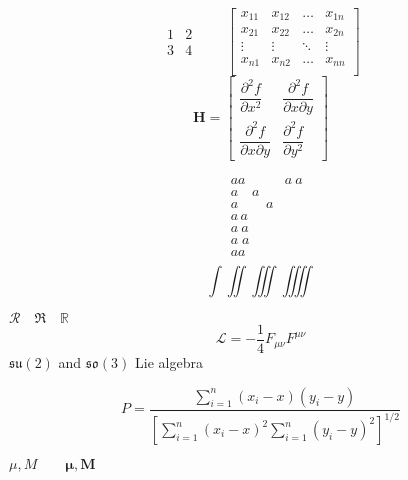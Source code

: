 \documentclass{article}
\begin{document}
	\[
	\begin{matrix}
	1 & 2 \\ 3 & 4
	\end{matrix} \qquad
	\begin{bmatrix}
	x_{11} & x_{12} & \ldots & x_{1n}\\
	x_{21} & x_{22} & \ldots & x_{2n}\\
	\vdots & \vdots & \ddots & \vdots\\
	x_{n1} & x_{n2} & \ldots & x_{nn}\\
	\end{bmatrix}
	\]
	\[
	\mathbf{H}=
	\begin{bmatrix}
	\dfrac{\partial^2 f}{\partial x^2} &
	\dfrac{\partial^2 f}
	{\partial x \partial y} \\[8pt]
	\dfrac{\partial^2 f}
	{\partial x \partial y} &
	\dfrac{\partial^2 f}{\partial y^2}
	\end{bmatrix}
	\]
	
	\newpage
	\begin{equation}
		\begin{aligned}
			&aa
			&a\ a\\
			&a\quad a\\
			&a\qquad a\\
			&a\,a\\
			&a\:a\\
			&a\;a\\
			&a\!a\\
		\end{aligned}
	\end{equation}
	$$\int \iint \iiint \iiiint$$
	
	
	
	$\mathcal{R} \quad \mathfrak{R}
	\quad \mathbb{R}$
	\[\mathcal{L}
	= -\frac{1}{4}F_{\mu\nu}F^{\mu\nu}\]
	$\mathfrak{su}(2)$ and
	$\mathfrak{so}(3)$ Lie algebra
	
	
	\[
	P = \frac
	{\sum_{i=1}^n (x_i- x)(y_i- y)}
	{\displaystyle \left[
	\sum_{i=1}^n (x_i-x)^2
	\sum_{i=1}^n (y_i-y)^2
	\right]^{1/2} }
	\]
	
	$\mu, M \qquad
	\boldsymbol{\mu}, \boldsymbol{M}$
	
\end{document}
